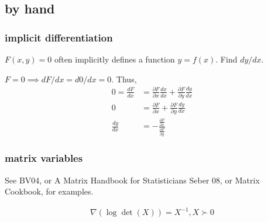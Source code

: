 \documentclass[class=article,crop=false]{standalone}
\begin{document}
\subsection{by hand}
\subsubsection{implicit differentiation}

$ F(x,y) = 0$ often implicitly defines a function  $ y = f(x)$. Find  $ dy /dx$.

 $ F = 0 \implies dF / dx =  d0 / dx =0$. Thus,
 \begin{align*}
 	0=\frac{d F}{d x} &= \frac{\partial F}{\partial x} \frac{d x}{d x} + \frac{\partial F}{\partial y} \frac{d y}{d x}  \\
	0&= \frac{\partial F}{\partial x} + \frac{\partial F}{\partial y} \frac{dy}{dx} \\
	\frac{d y}{d x} &= - \frac{ \frac{\partial F}{\partial x} }{ \frac{\partial F}{\partial y} }
 \end{align*}

\subsubsection{matrix variables}
See BV04, or A Matrix Handbook for Statisticians Seber 08, or Matrix Cookbook, for examples.
\begin{eg}
\begin{align*}
	\nabla (\log \det (X)) = X^{-1}, X \succ 0
\end{align*}
\end{eg}
\end{document}
